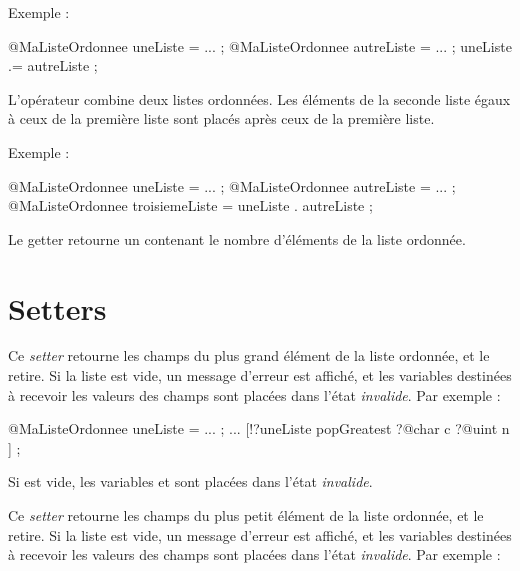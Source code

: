 Exemple :
\begin{galgascode}
@MaListeOrdonnee uneListe = ... ;
@MaListeOrdonnee autreListe = ... ;
uneListe .= autreListe ;
\end{galgascode}


L'opérateur  combine deux listes ordonnées. Les éléments de la seconde liste égaux à ceux de la première liste sont placés après ceux de la première liste.

Exemple :
\begin{galgascode}
@MaListeOrdonnee uneListe = ... ;
@MaListeOrdonnee autreListe = ... ;
@MaListeOrdonnee troisiemeListe = uneListe . autreListe ;
\end{galgascode}








Le getter  retourne un  contenant le nombre d'éléments de la liste ordonnée.






\section{Setters}


Ce \emph{setter} retourne les champs du plus grand élément de la liste ordonnée, et le retire. Si la liste est vide, un message d'erreur est affiché, et les variables destinées à recevoir les valeurs des champs sont placées dans l'état \emph{invalide}. Par exemple :

\begin{galgascode}
@MaListeOrdonnee uneListe = ... ;
...
[!?uneListe popGreatest
  ?@char c
  ?@uint n
] ;
\end{galgascode}

Si  est vide, les variables  et  sont placées dans l'état \emph{invalide}.



Ce \emph{setter} retourne les champs du plus petit élément de la liste ordonnée, et le retire. Si la liste est vide, un message d'erreur est affiché, et les variables destinées à recevoir les valeurs des champs sont placées dans l'état \emph{invalide}. Par exemple :

